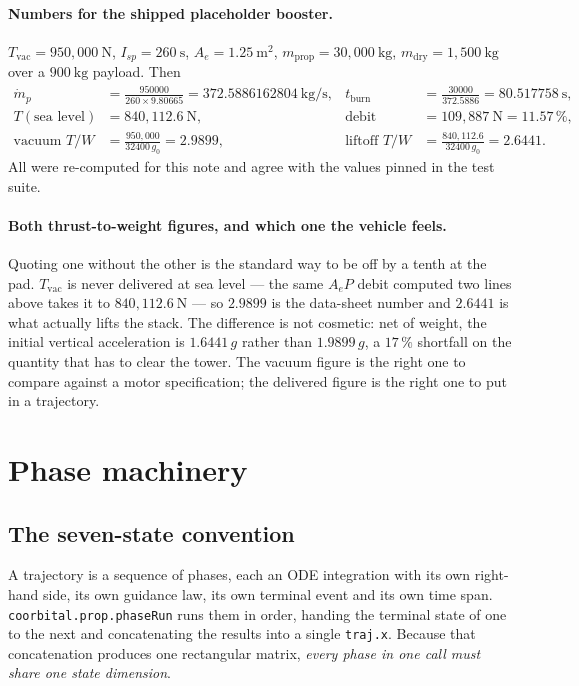 \documentclass[11pt]{article}
\newcommand{\code}[1]{\texttt{#1}}
\begin{document}
\paragraph{Numbers for the shipped placeholder booster.}
$T_{\text{vac}}=950{,}000~\mathrm{N}$, $I_{sp}=260~\mathrm{s}$,
$A_e=1.25~\mathrm{m^2}$, $m_{\text{prop}}=30{,}000~\mathrm{kg}$,
$m_{\text{dry}}=1{,}500~\mathrm{kg}$ over a $900~\mathrm{kg}$ payload. Then
\begin{align*}
  \dot m_p &= \frac{950000}{260\times 9.80665} = 372.5886162804~\mathrm{kg/s},
  & t_{\text{burn}} &= \frac{30000}{372.5886} = 80.517758~\mathrm{s}, \\
  T(\text{sea level}) &= 840{,}112.6~\mathrm{N},
  & \text{debit} &= 109{,}887~\mathrm{N} = 11.57\,\% ,\\
  \text{vacuum } T/W &= \frac{950{,}000}{32400\,g_0} = 2.9899 ,
  & \text{liftoff } T/W &= \frac{840{,}112.6}{32400\,g_0} = 2.6441 .
\end{align*}
All were re-computed for this note and agree with the values pinned in the
test suite.

\paragraph{Both thrust-to-weight figures, and which one the vehicle feels.}
Quoting one without the other is the standard way to be off by a tenth at the
pad. $T_{\text{vac}}$ is never delivered at sea level --- the same
$A_eP$ debit computed two lines above takes it to $840{,}112.6~\mathrm{N}$ ---
so $2.9899$ is the data-sheet number and $2.6441$ is what actually lifts the
stack. The difference is not cosmetic: net of weight, the initial vertical
acceleration is $1.6441\,g$ rather than $1.9899\,g$, a $17\,\%$ shortfall on
the quantity that has to clear the tower. The vacuum figure is the right one
to compare against a motor specification; the delivered figure is the right one
to put in a trajectory.

\section{Phase machinery}
\label{sec:phases}

\subsection{The seven-state convention}

A trajectory is a sequence of phases, each an ODE integration with its own
right-hand side, its own guidance law, its own terminal event and its own time
span. \code{coorbital.prop.phaseRun} runs them in order, handing the terminal
state of one to the next and concatenating the results into a single
\code{traj.x}. Because that concatenation produces one rectangular matrix,
\emph{every phase in one call must share one state dimension}.
\end{document}
